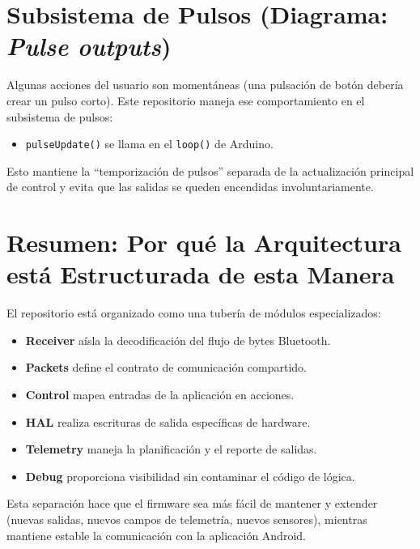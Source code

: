 \section{Subsistema de Pulsos (Diagrama: \textit{Pulse outputs})}

Algunas acciones del usuario son momentáneas (una pulsación de botón debería crear un pulso corto).
Este repositorio maneja ese comportamiento en el subsistema de pulsos:

\begin{itemize}
    \item \texttt{pulseUpdate()} se llama en el \texttt{loop()} de Arduino.
\end{itemize}

Esto mantiene la ``temporización de pulsos'' separada de la actualización principal de control y evita que las salidas se queden encendidas involuntariamente.

\section{Resumen: Por qué la Arquitectura está Estructurada de esta Manera}
El repositorio está organizado como una tubería de módulos especializados:

\begin{itemize}
    \item \textbf{Receiver} aísla la decodificación del flujo de bytes Bluetooth.
    \item \textbf{Packets} define el contrato de comunicación compartido.
    \item \textbf{Control} mapea entradas de la aplicación en acciones.
    \item \textbf{HAL} realiza escrituras de salida específicas de hardware.
    \item \textbf{Telemetry} maneja la planificación y el reporte de salidas.
    \item \textbf{Debug} proporciona visibilidad sin contaminar el código de lógica.
\end{itemize}

Esta separación hace que el firmware sea más fácil de mantener y extender (nuevas salidas, nuevos campos de telemetría, nuevos sensores),
mientras mantiene estable la comunicación con la aplicación Android.


%




